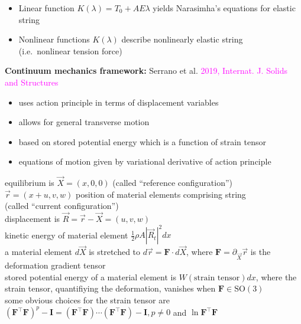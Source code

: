 \documentclass[landscape]{slides}
\def\myref#1{\textcolor{magenta}{\small #1}}
\begin{document}
\begin{itemize}
\item
Linear function $K(\lambda) = T_0 + AE\lambda$
yields Narasimha's equations for elastic string
\item
Nonlinear functions $K(\lambda)$ describe nonlinearly elastic string\\
(i.e.\ nonlinear tension force)
\end{itemize}

\newpage

\textbf{Continuum mechanics framework:}  
Serrano et al. \myref{2019, Internat. J. Solids and Structures}

\begin{itemize}
\item
uses action principle in terms of displacement variables
\item
allows for general transverse motion
\item 
based on stored potential energy which is a function of strain tensor
\item
equations of motion given by variational derivative of action principle
\end{itemize}
\hfil

equilibrium is $\vec{X} = (x,0,0)$ (called ``reference configuration'')
\\

$\vec{r} = (x+u,v,w)$ position of material elements comprising string\\
(called ``current configuration'')
\\

displacement is $\vec{R} = \vec{r} - \vec{X} = (u,v,w)$
\\

kinetic energy of material element $\tfrac{1}{2}\rho A |\vec{R}_t|^2 dx$
\\

a material element $d\vec{X}$ is stretched to  
$d\vec{r} 
= 
\mathbf{F} \cdot d\vec{X}$,
where 
$\mathbf{F} = \partial_{\vec{X}} \vec{r}$ is the deformation gradient tensor
\\

stored potential energy of a material element is
$W(\text{strain tensor})dx$,
where the strain tensor, quantifiying the deformation, vanishes when $\mathbf{F} \in \text{SO}(3)$
\\

some obvious choices for the strain tensor are 
$(\mathbf{F}^\top \mathbf{F})^p - \mathbf{I} 
= (\mathbf{F}^\top \mathbf{F}) \cdots (\mathbf{F}^\top \mathbf{F}) - \mathbf{I}, p \neq 0$ and $\ln \mathbf{F}^\top \mathbf{F}$
\\
\end{document}
